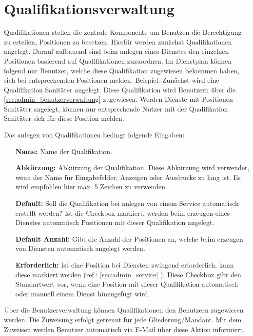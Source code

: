 \section{Qualifikationsverwaltung}
\label{sec:admin_qualifikationsverwaltung}
Qualifikationen stellen die zentrale Komponente um Benutzen die Berechtigung zu erteilen, Positionen zu besetzen. Hierfür werden zunächst Qualifikationen angelegt. Darauf aufbauend sind beim anlegen eines Dienstes den einzelnen Positionen basierend auf Qualifikationen zuzuordnen. Im Dienstplan können folgend nur Benutzer, welche diese Qualifikation zugewiesen bekommen haben, sich bei entsprechenden Positionen melden. Beispiel: Zunächst wird eine Qualifikation Sanitäter angelegt. Diese Qualifikation wird Benutzern über die \ref{sec:admin_benutzerverwaltung}  zugewiesen. Werden Dienste mit Positionen \glqq Sanitäter\grqq{} angelegt, können nur entsprechende Nutzer mit der Qualifikation \glqq Sanitäter\grqq{} sich für diese Position melden.

\vspace*{5mm} \noindent Das anlegen von Qualifikationen bedingt folgende Eingaben:

\begin{itemize}
	\item[\textbf{Name:}] Name der Qualifikation.
	\item[\textbf{Abkürzung:}] Abkürzung der Qualifikation. Diese Abkürzung wird verwendet, wenn der Name für Eingabefelder, Anzeigen oder Ausdrucke zu lang ist. Es wird empfohlen hier max. 5 Zeichen zu verwenden.
	\item[\textbf{Default:}] \glqq Soll die Qualifikation bei anlegen von einem Service automatisch erstellt werden?\grqq{} Ist die Checkbox markiert, werden beim erzeugen eines Dienstes automatisch Positionen mit dieser Qualifikation angelegt.
	\item[\textbf{Default Anzahl:}] Gibt die Anzahl der Positionen an, welche beim erzeugen von Diensten automatisch angelegt werden.
	\item[\textbf{Erforderlich:}] Ist eine Position bei Diensten zwingend erforderlich, kann diese markiert werden (ref.: \ref{sec:admin_service} ). Diese Checkbox gibt den Standartwert vor, wenn eine Position mit dieser Qualifikation automatisch oder manuell einem Dienst hinzugefügt wird.
\end{itemize}

\begin{lamp}[frametitle={Qualifikationen Benutzern zuweisen}]
	Über die Benutzerverwaltung können Qualifikationen den Benutzern zugewiesen werden. Die Zuweisung erfolgt getrennt für jede Gliederung/Mandant. Mit dem Zuweisen werden Benutzer automatisch via E-Mail über diese Aktion informiert.
\end{lamp}

